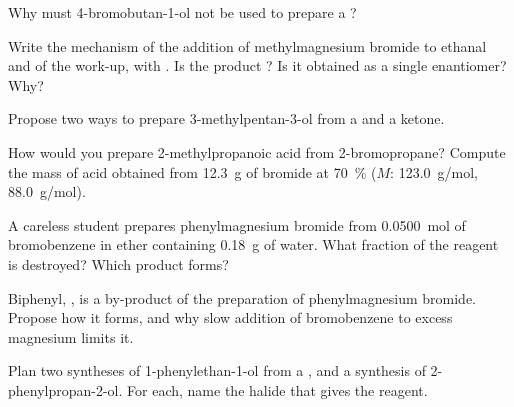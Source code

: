 \begin{exercise}[$\star$]\label{exo:b1:organomagnesium:4}
Why must 4-bromobutan-1-ol not be used to prepare a ?
\end{exercise}

\begin{exercise}[$\star\star$]\label{exo:b1:organomagnesium:5}
Write the mechanism of the addition of methylmagnesium bromide to ethanal
and of the work-up, with . Is the product ? Is it
obtained as a single enantiomer? Why?
\end{exercise}

\begin{exercise}[$\star\star$]\label{exo:b1:organomagnesium:6}
Propose two ways to prepare 3-methylpentan-3-ol from a 
and a ketone.
\end{exercise}

\begin{exercise}[$\star\star$]\label{exo:b1:organomagnesium:7}
How would you prepare 2-methylpropanoic acid from 2-bromopropane? Compute
the mass of acid obtained from \qty{12.3}{g} of bromide at
\qty{70}{\percent}  ($M$:  \qty{123.0}{g/mol}, 
\qty{88.0}{g/mol}).
\end{exercise}

\begin{exercise}[$\star\star$]\label{exo:b1:organomagnesium:8}
A careless student prepares phenylmagnesium bromide from
\qty{0.0500}{mol} of bromobenzene in ether containing \qty{0.18}{g} of
water. What fraction of the reagent is destroyed? Which product forms?
\end{exercise}

\begin{exercise}[$\star\star$]\label{exo:b1:organomagnesium:9}
Biphenyl, , is a by-product of the preparation of
phenylmagnesium bromide. Propose how it forms, and why slow addition of
bromobenzene to excess magnesium limits it.
\end{exercise}

\begin{exercise}[$\star\star\star$]\label{exo:b1:organomagnesium:10}
Plan two syntheses of 1-phenylethan-1-ol from a , and a
synthesis of 2-phenylpropan-2-ol. For each, name the halide that gives the
reagent.
\end{exercise}

